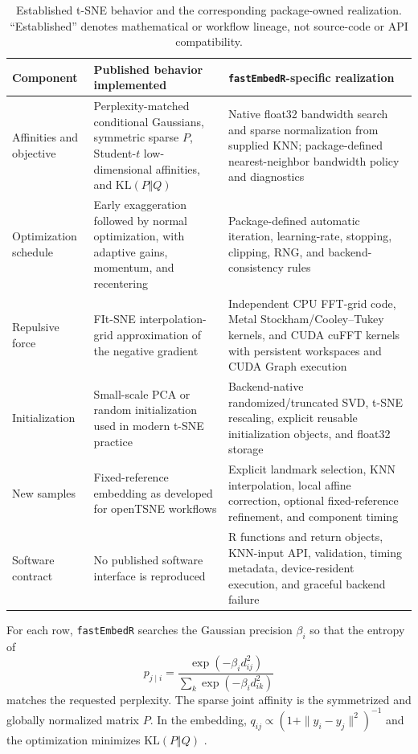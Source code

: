 \documentclass[twoside,11pt]{article}
\newcommand{\pkg}{\texttt{fastEmbedR}}
\begin{document}
\begin{table}[ht]
\centering
\caption{Established t-SNE behavior and the corresponding package-owned
realization. ``Established'' denotes mathematical or workflow lineage, not
source-code or API compatibility.}
\label{tab:opentsne-lineage}
\footnotesize
\begin{tabular}{p{}p{}p{}}
\toprule
Component & Published behavior implemented & \pkg{}-specific realization\\
\midrule
Affinities and objective &
Perplexity-matched conditional Gaussians, symmetric sparse $P$, Student-$t$
low-dimensional affinities, and $\mathrm{KL}(P\Vert Q)$ &
Native float32 bandwidth search and sparse normalization from supplied KNN;
package-defined nearest-neighbor bandwidth policy and diagnostics\\
Optimization schedule &
Early exaggeration followed by normal optimization, with adaptive gains,
momentum, and recentering &
Package-defined automatic iteration, learning-rate, stopping, clipping, RNG,
and backend-consistency rules\\
Repulsive force &
FIt-SNE interpolation-grid approximation of the negative gradient &
Independent CPU FFT-grid code, Metal Stockham/Cooley--Tukey kernels, and CUDA
cuFFT kernels with persistent workspaces and CUDA Graph execution\\
Initialization &
Small-scale PCA or random initialization used in modern t-SNE practice &
Backend-native randomized/truncated SVD, t-SNE rescaling, explicit reusable
initialization objects, and float32 storage\\
New samples &
Fixed-reference embedding as developed for openTSNE workflows &
Explicit landmark selection, KNN interpolation, local affine correction,
optional fixed-reference refinement, and component timing\\
Software contract &
No published software interface is reproduced &
R functions and return objects, KNN-input API, validation, timing metadata,
device-resident execution, and graceful backend failure\\
\bottomrule
\end{tabular}
\end{table}

For each row, \pkg{} searches the Gaussian precision $\beta_i$ so that the entropy of
\[
 p_{j\mid i}=\frac{\exp(-\beta_i d_{ij}^{2})}{\sum_{k}\exp(-\beta_i d_{ik}^{2})}
\]
matches the requested perplexity. The sparse joint affinity is the symmetrized and globally normalized matrix $P$. In the embedding, $q_{ij}\propto(1+\|y_i-y_j\|^2)^{-1}$ and the optimization minimizes $\mathrm{KL}(P\Vert Q)$ \citep{vandermaaten2008}.
\end{document}
